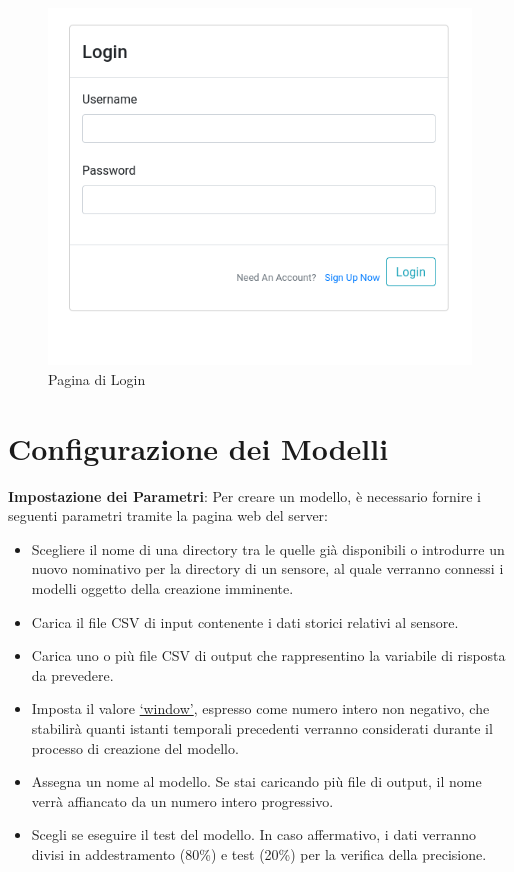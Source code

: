 \documentclass{rapportECL}
\begin{document}
\begin{enumerate}
\begin{figure}[htp]
\begin{minipage}[b]{0.5\linewidth}
      \includegraphics[width=\linewidth]{images/img3.png}
      \caption{Pagina di Login}
    \end{minipage}
  \end{figure}


\end{enumerate}


\section{Configurazione dei Modelli}


\textbf{Impostazione dei Parametri}: Per creare un modello, è necessario fornire i seguenti parametri tramite la pagina web del server:
\begin{itemize}
  \item Scegliere il nome di una directory tra le quelle già disponibili o introdurre un nuovo nominativo per la directory di un sensore, al quale verranno connessi i modelli oggetto della creazione imminente.
  \item Carica il file CSV di input contenente i dati storici relativi al sensore.
  \item Carica uno o più file CSV di output che rappresentino la variabile di risposta da prevedere.
  \item Imposta il valore  \hyperref[win]{`window'}, espresso come numero intero non negativo, che stabilirà quanti istanti temporali precedenti verranno considerati durante il processo di creazione del modello.
  \item Assegna un nome al modello. Se stai caricando più file di output, il nome verrà affiancato da un numero intero progressivo.
  \item Scegli se eseguire il test del modello. In caso affermativo, i dati verranno divisi in addestramento (80\%) e test (20\%) per la verifica della precisione.
\end{itemize}
\end{document}
